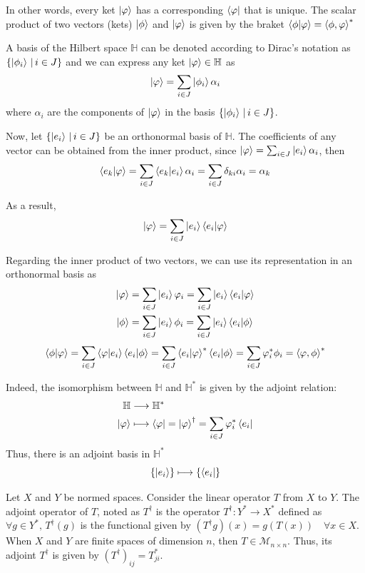 In other words, every ket $\ket{\varphi}$ has a corresponding $\bra{\varphi}$ that is unique. The scalar product of two vectors (kets) $\ket{\phi}$ and $\ket{\varphi}$ is given by the braket $\braket{\phi | \varphi}= \braket{\phi , \varphi}^{*}$

A basis of the Hilbert space $\mathbb{H}$ can be denoted according to Dirac's notation as $\left\lbrace \ket{\phi_i} \, | \, i \in J \right\rbrace$ and we can express any ket $\ket{\varphi} \in \mathbb{H}$ as 
$$\ket{\varphi} = \sum_{i \in J}\ket{\phi_i} \alpha_i$$
where $\alpha_i$ are the components of $\ket{\varphi }$ in the basis $\left\lbrace \ket{\phi_i} \, | \, i \in J \right\rbrace$.

Now, let $\left\lbrace \ket{e_i} \, | \, i \in J \right\rbrace$ be an orthonormal basis of $\mathbb{H}$. The coefficients of any vector can be obtained from the inner product, since $\ket{\varphi} = \sum_{i \in J}\ket{e_i} \alpha_i $, then
$$\braket{e_k|\varphi}= \sum_{i \in J}\braket{e_k|e_i} \alpha_i = \sum_{i \in J} \delta_{ki}\alpha_i = \alpha_k$$

As a result,
$$\ket{\varphi} = \sum_{i \in J}\ket{e_i} \braket{e_i|\varphi}$$

Regarding the inner product of two vectors, we can use its representation in an orthonormal basis as
\begin{align}
    \ket{\varphi} &= \sum_{i \in J}\ket{e_i} \varphi_i = \sum_{i \in J}\ket{e_i} \braket{e_i|\varphi} \\
    \ket{\phi} &= \sum_{i \in J}\ket{e_i} \phi_i = \sum_{i \in J}\ket{e_i} \braket{e_i|\phi}
\end{align}
$$\braket{\phi | \varphi} = \sum_{i \in J}\braket{\varphi | e_i} \braket{e_i|\phi} = \sum_{i \in J}\braket{e_i | \varphi}^{*} \braket{e_i|\phi} = \sum_{i \in J}\varphi_i^{*} \phi_i = \braket{\varphi, \phi}^{*} $$

Indeed, the isomorphism between $\mathbb{H}$ and $\mathbb{H}^{*}$ is given by the adjoint relation:
\begin{align}
    \mathbb{H} &\longrightarrow \mathbb{H}^{*} \\
    \ket{\varphi} &\longmapsto \bra{\varphi} = \ket{\varphi}^\dag =\sum_{i \in J} \varphi_i^{*} \bra{e_i}
\end{align}
Thus, there is an adjoint basis in $\mathbb{H}^{*}$
$$\left\lbrace \ket{e_i}\right\rbrace  \longmapsto \left\lbrace \bra{e_i}\right\rbrace$$

\begin{definicion}
    Let $X$ and $Y$ be normed spaces. Consider the linear operator $T$ from $X$ to $Y$. The adjoint operator of $T$, noted as $T^\dag$ is the operator $T^\dag : Y^* \longrightarrow X^* $ defined as $\forall g \in Y^*,\, T^\dag (g)$ is the functional given by $(T^\dag g)(x) = g(T(x)) \quad \forall x \in X$. 
    When $X$ and $Y$ are finite spaces of dimension $n$, then $T \in \mathcal{M}_{n \times n}$. Thus, its adjoint $T^\dag$ is given by $(T^\dag)_{ij}= T^*_{ji}$. 
\end{definicion}

